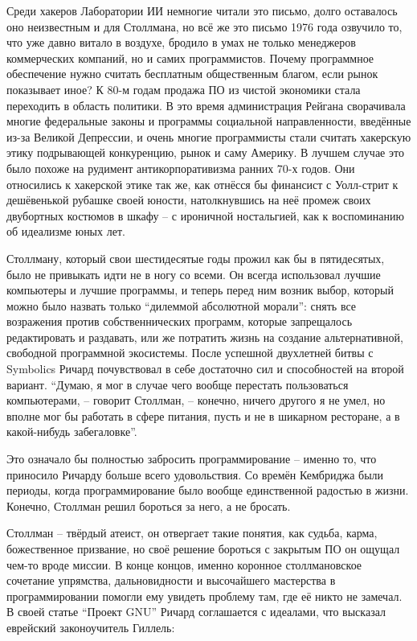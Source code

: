 Среди хакеров Лаборатории ИИ немногие читали это письмо, долго оставалось оно неизвестным и для Столлмана, но всё же это письмо 1976 года озвучило то, что уже давно витало в воздухе, бродило в умах не только менеджеров коммерческих компаний, но и самих программистов. Почему программное обеспечение нужно считать бесплатным общественным благом, если рынок показывает иное? К 80-м годам продажа ПО из чистой экономики стала переходить в область политики. В это время администрация Рейгана сворачивала многие федеральные законы и программы социальной направленности, введённые из-за Великой Депрессии, и очень многие программисты стали считать хакерскую этику подрывающей конкуренцию, рынок и саму Америку. В лучшем случае это было похоже на рудимент антикорпоративизма ранних 70-х годов. Они относились к хакерской этике так же, как отнёсся бы финансист с Уолл-стрит к дешёвенькой рубашке своей юности, натолкнувшись на неё промеж своих двубортных костюмов в шкафу -- с ироничной ностальгией, как к воспоминанию об идеализме юных лет.

Столлману, который свои шестидесятые годы прожил как бы в пятидесятых, было не привыкать идти не в ногу со всеми. Он всегда использовал лучшие компьютеры и лучшие программы, и теперь перед ним возник выбор, который можно было назвать только \enquote{дилеммой абсолютной морали}: снять все возражения против собственнических программ, которые запрещалось редактировать и раздавать, или же потратить жизнь на создание альтернативной, свободной программной экосистемы. После успешной двухлетней битвы с Symbolics Ричард почувствовал в себе достаточно сил и способностей на второй вариант. \enquote{Думаю, я мог в случае чего вообще перестать пользоваться компьютерами, -- говорит Столлман, -- конечно, ничего другого я не умел, но вполне мог бы работать в сфере питания, пусть и не в шикарном ресторане, а в какой-нибудь забегаловке}.

Это означало бы полностью забросить программирование -- именно то, что приносило Ричарду больше всего удовольствия. Со времён Кембриджа были периоды, когда программирование было вообще единственной радостью в жизни. Конечно, Столлман решил бороться за него, а не бросать.

Столлман -- твёрдый атеист, он отвергает такие понятия, как судьба, карма, божественное призвание, но своё решение бороться с закрытым ПО он ощущал чем-то вроде миссии. В конце концов, именно коронное столлмановское сочетание упрямства, дальновидности и высочайшего мастерства в программировании помогли ему увидеть проблему там, где её никто не замечал. В своей статье \enquote{Проект GNU} Ричард соглашается с идеалами, что высказал еврейский законоучитель Гиллель:

